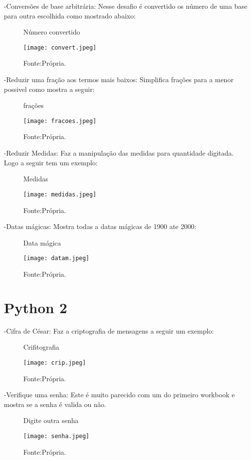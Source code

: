 -Conversões de base arbitrária:
Nesse desafio é convertido os número de uma base para outra escolhida como mostrado abaixo:

\begin{figure} [h!]	
    \centering
    \caption{Número convertido}
    \texttt{[image: convert.jpeg]}
    \caption*{Fonte:Própria.}
    \label{fig:convert}
\end{figure}

-Reduzir uma fração aos termos mais baixos:
Simplifica frações para a menor possivel como mostra a seguir:
\begin{figure} [h!]	
    \centering
    \caption{frações}
    \texttt{[image: fracoes.jpeg]}
    \caption*{Fonte:Própria.}
    \label{fig:fracao}
\end{figure}

-Reduzir Medidas:
Faz a manipulação das medidas para quantidade digitada.
Logo a seguir tem um exemplo:

\begin{figure} [h!]	
    \centering
    \caption{Medidas}
    \texttt{[image: medidas.jpeg]}
    \caption*{Fonte:Própria.}
    \label{fig:medidas}
\end{figure}

-Datas mágicas:
Mostra todas a datas mágicas de 1900 ate 2000:

\begin{figure} [h!]	
    \centering
    \caption{Data mágica}
    \texttt{[image: datam.jpeg]}
    \caption*{Fonte:Própria.}
    \label{fig:datamagica}
\end{figure}

\section{Python 2}

-Cifra de César:
Faz a criptografia de mensagens a seguir um exemplo:

\begin{figure} [h!]	
    \centering
    \caption{Crifitografia}
    \texttt{[image: crip.jpeg]}
    \caption*{Fonte:Própria.}
    \label{fig:criptografia}
\end{figure}

-Verifique uma senha:
Este é muito parecido com um do primeiro workbook e mostra se a senha é valida ou não.

\begin{figure} [h!]	
    \centering
    \caption{Digite outra senha}
    \texttt{[image: senha.jpeg]}
    \caption*{Fonte:Própria.}
    \label{fig:Senha}
\end{figure}

